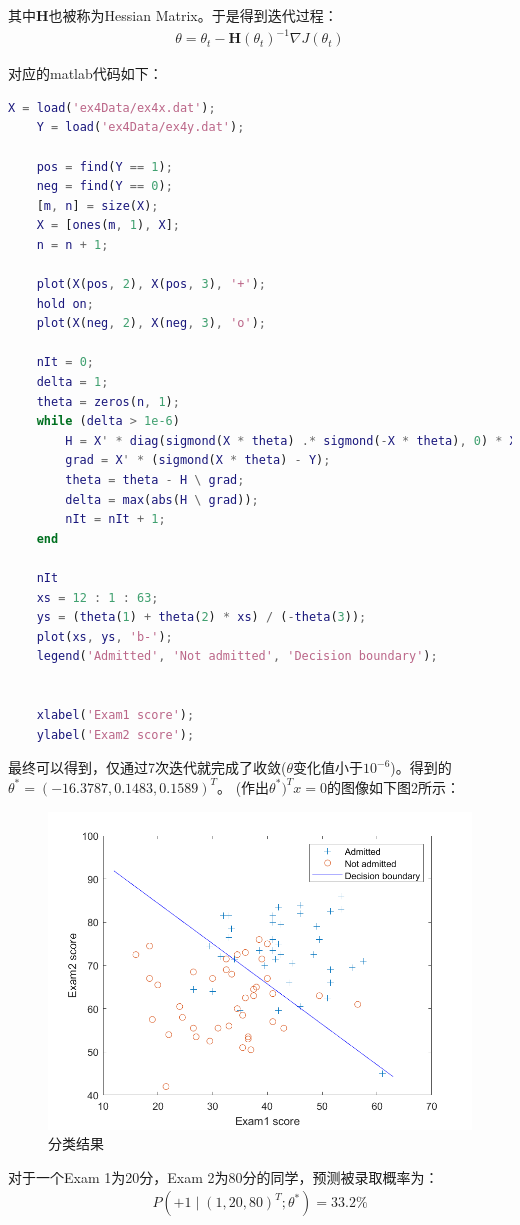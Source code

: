 \documentclass{article}
\begin{document}
其中$\textbf{H}$也被称为Hessian Matrix。于是得到迭代过程：
\begin{equation}
    \begin{split}
        \theta = \theta_t - \textbf{H}(\theta_t)^{-1}\nabla J(\theta_t)
    \end{split}
\end{equation}

对应的matlab代码如下：
\begin{lstlisting}[language=matlab]
    X = load('ex4Data/ex4x.dat');
    Y = load('ex4Data/ex4y.dat');

    pos = find(Y == 1);
    neg = find(Y == 0);
    [m, n] = size(X);
    X = [ones(m, 1), X];
    n = n + 1;

    plot(X(pos, 2), X(pos, 3), '+');
    hold on;
    plot(X(neg, 2), X(neg, 3), 'o');

    nIt = 0;
    delta = 1;
    theta = zeros(n, 1);
    while (delta > 1e-6)
        H = X' * diag(sigmond(X * theta) .* sigmond(-X * theta), 0) * X;
        grad = X' * (sigmond(X * theta) - Y);
        theta = theta - H \ grad;
        delta = max(abs(H \ grad));
        nIt = nIt + 1;
    end

    nIt
    xs = 12 : 1 : 63;
    ys = (theta(1) + theta(2) * xs) / (-theta(3));
    plot(xs, ys, 'b-');
    legend('Admitted', 'Not admitted', 'Decision boundary');


    xlabel('Exam1 score');
    ylabel('Exam2 score');
\end{lstlisting}

最终可以得到，仅通过7次迭代就完成了收敛($\theta$变化值小于$10^{-6}$)。得到的$\theta^*=(-16.3787,0.1483, 0.1589)^T$。
(作出$\theta^*)^Tx=0$的图像如下图2所示：
\begin{figure}[h]
    \centering
    \includegraphics[width=0.7\linewidth]{2.png}    
    \caption{分类结果}
\end{figure}

对于一个Exam 1为20分，Exam 2为80分的同学，预测被录取概率为：
\begin{equation}
    \begin{split}
        P(+1\;|\;(1,20,80)^T;\theta^*)=33.2\%
    \end{split}
\end{equation}
\end{document}
